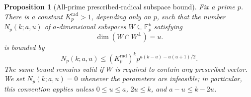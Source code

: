 \documentclass[11pt]{article}
\newcommand{\F}{\mathbb F}
\newcommand{\1}{\mathbf 1}
\theoremstyle{plain}
\newtheorem{proposition}[theorem]{Proposition}
\theoremstyle{definition}
\theoremstyle{remark}
\begin{document}
\begin{proposition}[All-prime prescribed-radical subspace bound]
\label{prop:all-prime-prescribed-radical-bound}
Fix a prime $p$.  There is a constant $K_p^{\mathrm{rad}}>1$, depending only
on $p$, such that the number $N_p(k;a,u)$ of $a$-dimensional subspaces
$W\subseteq\F_p^k$ satisfying
\begin{equation}
 \dim(W\cap W^\perp)=u.
 \label{eq:all-prime-prescribed-radical-condition}
\end{equation}
is bounded by
\begin{equation}
 N_p(k;a,u)
 \le (K_p^{\mathrm{rad}})^k
 p^{a(k-a)-u(u+1)/2}.
 \label{eq:all-prime-prescribed-radical-bound}
\end{equation}
The same bound remains valid if $W$ is required to contain any prescribed
vector.  We set $N_p(k;a,u)=0$ whenever the parameters are infeasible; in
particular, this convention applies unless
$0\le u\le a$, $2u\le k$, and $a-u\le k-2u$.
\end{proposition}
\end{document}
